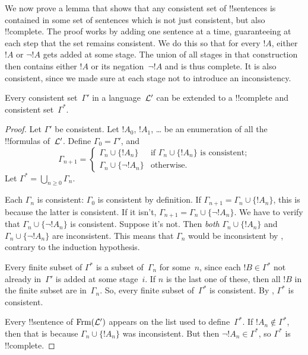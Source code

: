 \documentclass[../../../include/open-logic-section]{subfiles}
\begin{document}

\begin{explain}
We now prove a lemma that shows that any consistent set of
!!{sentence}s is contained in some set of sentences which is not just
consistent, but also !!{complete}. The proof works by adding one
sentence at a time, guaranteeing at each step that the set remains
consistent. We do this so that for every $!A$, either $!A$ or $\lnot
!A$ gets added at some stage. The union of all stages in that
construction then contains either $!A$ or its negation~$\lnot !A$ and
is thus complete. It is also consistent, since we made sure at each
stage not to introduce an inconsistency.
\end{explain}

\begin{lem}
 Every consistent set~$\Gamma'$ in a
language~$\mathcal L'$ can be extended to a !!{complete} and consistent
set~$\Gamma^*$.
\end{lem}

\begin{proof}
Let $\Gamma'$ be consistent.  Let $!A_0$, $!A_1$, \dots{}
be an enumeration of all the !!{formula}s of~$\mathcal L'$.  Define
$\Gamma_0 = \Gamma'$, and
\[
\Gamma_{n+1} =
\begin{cases}
\Gamma_n \cup \{ !A_n \} & \textrm{if $\Gamma_n \cup \{!A_n\}$ is
  consistent;} \\
\Gamma_n \cup \{ \lnot !A_n \} & \textrm{otherwise.}
\end{cases}
\]
Let $\Gamma^* = \bigcup_{n \geq 0} \Gamma_n$.

Each $\Gamma_n$ is consistent: $\Gamma_0$ is consistent by definition.
If $\Gamma_{n+1} = \Gamma_n \cup \{!A_n\}$, this is because the latter
is consistent.  If it isn't, $\Gamma_{n+1} = \Gamma_n \cup \{\lnot
!A_n\}$. We have to verify that $\Gamma_n \cup \{\lnot !A_n\}$ is
consistent. Suppose it's not. Then \emph{both} $\Gamma_n \cup
\{!A_n\}$ and $\Gamma_n \cup \{\lnot !A_n\}$ are inconsistent.  This
means that $\Gamma_n$ would be inconsistent by
,
contrary to the induction hypothesis.

Every finite subset of $\Gamma^*$ is a subset of~$\Gamma_n$ for
some~$n$, since each $!B \in \Gamma^*$ not already in~$\Gamma'$ is
added at some stage~$i$. If $n$ is the last one of these, then all
$!B$ in the finite subset are in~$\Gamma_n$. So, every finite subset
of~$\Gamma^*$ is consistent. By
,
$\Gamma^*$ is consistent.

Every !!{sentence} of $\Frm[L']$ appears on the list used to
define~$\Gamma^*$. If $!A_n \notin \Gamma^*$, then that is because
$\Gamma_n \cup \{!A_n\}$ was inconsistent.  But then $\lnot !A_n
\in \Gamma^*$, so $\Gamma^*$ is !!{complete}.
\end{proof}
\end{document}
